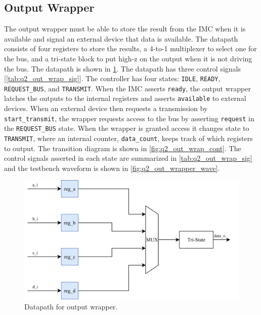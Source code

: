 \documentclass[../main.tex]{subfiles}
\begin{document}
\newpage

\subsection*{Output Wrapper}

The output wrapper must be able to store the result from the IMC when it is available and signal an external device that data is available. The datapath consists of four registers to store the results, a 4-to-1 multiplexer to select one for the bus, and a tri-state block to put high-z on the output when it is not driving the bus. The datapath is shown in \cref{fig:q2_out_wrap_dp}. The datapath has three control signals [\cref{tab:q2_out_wrap_sig}]. The controller has four states: \texttt{IDLE}, \texttt{READY}, \texttt{REQUEST\_BUS}, and \texttt{TRANSMIT}. When the IMC asserts \texttt{ready}, the output wrapper latches the outputs to the internal registers and asserts \texttt{available} to external devices. When an external device then requests a transmission by \texttt{start\_transmit}, the wrapper requests access to the bus by asserting \texttt{request} in the \texttt{REQUEST\_BUS} state. When the wrapper is granted access it changes state to \texttt{TRANSMIT}, where an internal counter, \texttt{data\_count}, keeps track of which registers to output. The transition diagram is shown in \cref{fig:q2_out_wrap_cont}. The control signals asserted in each state are summarized in \cref{tab:q2_out_wrap_sig} and the testbench waveform is shown in \cref{fig:q2_out_wrapper_wave}.

\begin{figure}[h]
    \centering
    \includegraphics[width=\linewidth]{assets/out_wrap_dp.png}
    \caption{Datapath for output wrapper.}
    \label{fig:q2_out_wrap_dp}
\end{figure}
\end{document}
